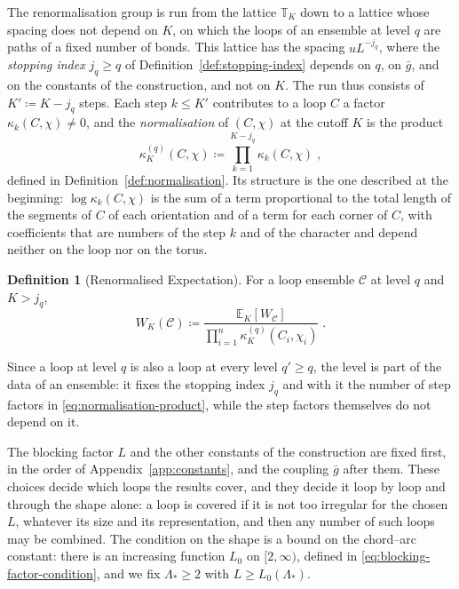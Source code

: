 \documentclass[11pt]{preprint}
\numberwithin{equation}{section}
\theoremstyle{definition}
\newtheorem{definition}[theorem]{Definition}
\theoremstyle{remark}
\theoremstyle{plain}
\begin{document}
The renormalisation group is run from the lattice $\mathbb T_K$ down to a lattice whose spacing does not depend on $K$, on which the loops of an ensemble at level $q$ are paths of a fixed number of bonds. This lattice has the spacing $uL^{-j_q}$, where the \emph{stopping index} $j_q \geq q$ of Definition~\ref{def:stopping-index} depends on $q$, on $\bar g$, and on the constants of the construction, and not on $K$. The run thus consists of $K' \coloneqq K - j_q$ steps. Each step $k \leq K'$ contributes to a loop $C$ a factor $\kappa_k(C, \chi) \neq 0$, and the \emph{normalisation} of $(C, \chi)$ at the cutoff $K$ is the product
\begin{equation}\label{eq:normalisation-product}
    \kappa_K^{(q)}(C, \chi) \coloneqq \prod_{k=1}^{K - j_q}\kappa_k(C, \chi)\;,
\end{equation}
defined in Definition~\ref{def:normalisation}. Its structure is the one described at the beginning: $\log\kappa_k(C, \chi)$ is the sum of a term proportional to the total length of the segments of $C$ of each orientation and of a term for each corner of $C$, with coefficients that are numbers of the step $k$ and of the character and depend neither on the loop nor on the torus.

\begin{definition}[Renormalised Expectation]\label{def:renormalised-expectation}
For a loop ensemble $\mathcal C$ at level $q$ and $K > j_q$,
\begin{equation}\label{eq:renormalised-expectation}
    W_K(\mathcal C) \coloneqq \frac{\mathbb E_K[W_{\mathcal C}]}{\prod_{i=1}^{n}\kappa_K^{(q)}(C_i, \chi_i)}\;.
\end{equation}
\end{definition}

Since a loop at level $q$ is also a loop at every level $q' \geq q$, the level is part of the data of an ensemble: it fixes the stopping index $j_q$ and with it the number of step factors in \eqref{eq:normalisation-product}, while the step factors themselves do not depend on it.

The blocking factor $L$ and the other constants of the construction are fixed first, in the order of Appendix~\ref{app:constants}, and the coupling $\bar g$ after them. These choices decide which loops the results cover, and they decide it loop by loop and through the shape alone: a loop is covered if it is not too irregular for the chosen $L$, whatever its size and its representation, and then any number of such loops may be combined. The condition on the shape is a bound on the chord--arc constant: there is an increasing function $L_0$ on $[2, \infty)$, defined in \eqref{eq:blocking-factor-condition}, and we fix $\Lambda_* \geq 2$ with $L \geq L_0(\Lambda_*)$.
\end{document}

